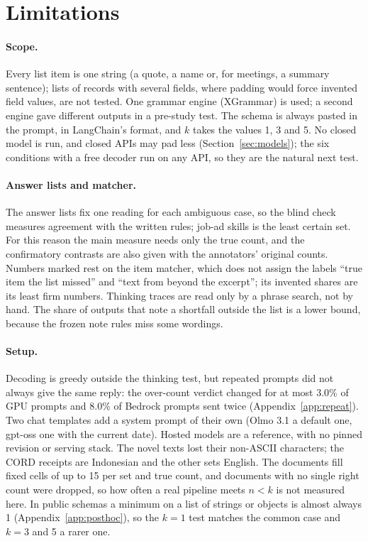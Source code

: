 \section*{Limitations}

\paragraph{Scope.}
Every list item is one string (a quote, a name or, for meetings, a summary sentence); lists of records with several fields, where padding would force invented field values, are not tested.
One grammar engine (XGrammar) is used; a second engine gave different outputs in a pre-study test.
The schema is always pasted in the prompt, in LangChain's format, and $k$ takes the values 1, 3 and 5.
No closed model is run, and closed APIs may pad less (Section~\ref{sec:models}); the six conditions with a free decoder run on any API, so they are the natural next test.

\paragraph{Answer lists and matcher.}
The answer lists fix one reading for each ambiguous case, so the blind check measures agreement with the written rules; job-ad skills is the least certain set.
For this reason the main measure needs only the true count, and the confirmatory contrasts are also given with the annotators' original counts.
Numbers marked \pre{} rest on the item matcher, which does not assign the labels ``true item the list missed'' and ``text from beyond the excerpt''; its invented shares are its least firm numbers.
Thinking traces are read only by a phrase search, not by hand.
The share of outputs that note a shortfall outside the list is a lower bound, because the frozen note rules miss some wordings.

\paragraph{Setup.}
Decoding is greedy outside the thinking test, but repeated prompts did not always give the same reply: the over-count verdict changed for at most 3.0\% of GPU prompts and 8.0\% of Bedrock prompts sent twice (Appendix~\ref{app:repeat}).
Two chat templates add a system prompt of their own (Olmo 3.1 a default one, gpt-oss one with the current date).
Hosted models are a reference, with no pinned revision or serving stack.
The novel texts lost their non-ASCII characters; the CORD receipts are Indonesian and the other sets English.
The documents fill fixed cells of up to 15 per set and true count, and documents with no single right count were dropped, so how often a real pipeline meets $n < k$ is not measured here.
In public schemas a minimum on a list of strings or objects is almost always 1 (Appendix~\ref{app:posthoc}), so the $k = 1$ test matches the common case and $k = 3$ and 5 a rarer one.
